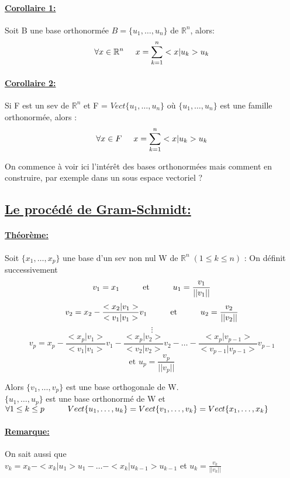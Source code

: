 \documentclass{article}
\newcommand\tab[1][1cm]{\hspace*{#1}}
\begin{document}
\paragraph{\underline{Corollaire 1:}} Soit B une base orthonormée $B = \{u_1, \dots, u_n\}$ de $\mathbb{R}^n$, alors:
$$\forall x \in \mathbb{R}^n \tab[0.5cm] x = \sum_{k=1}^n <x | u_k> u_k$$

\paragraph{\underline{Corollaire 2:}} Si F est un sev de $\mathbb{R}^n$ et F = $Vect\{u_1, \dots, u_n\}$ où $\{u_1, \dots, u_n\}$ est une famille orthonormée, alors :
$$\forall x \in F \tab[0.5cm] x = \sum_{k=1}^n <x | u_k> u_k$$

On commence à voir ici l'intérêt des bases orthonormées mais comment en construire, par exemple dans un sous espace vectoriel ?

\subsection{\underline{Le procédé de Gram-Schmidt:}}

\paragraph{\underline{Théorème:}} Soit $\{x_1, \dots, x_p\}$ une base d'un sev non nul W de $\mathbb{R}^n \; (1 \leq k \leq n)$ : On définit successivement
$$v_1 = x_1 \tab \mbox{et} \tab u_1 = \frac{v_1}{||v_1||}$$
$$v_2 = x_2 - \frac{<x_2|v_1>}{<v_1|v_1>}v_1 \tab \mbox{et} \tab u_2 = \frac{v_2}{||v_2||}$$
$$\vdots$$
$$v_p = x_p - \frac{<x_p|v_1>}{<v_1|v_1>}v_1 - \frac{<x_p|v_2>}{<v_2|v_2>}v_2 - \dots - \frac{<x_p|v_{p-1}>}{<v_{p-1}|v_{p-1}>}v_{p-1}$$
$$\mbox{et } u_p = \frac{v_p}{||v_p||}$$

Alors $\{v_1, \dots, v_p\}$ est une base orthogonale de W.\\
\tab[1.4cm] $\{u_1, \dots, u_p\}$ est une base orthonormé de W et\\
$\forall 1 \leq k \leq p \tab Vect\{u_1, \dots, u_k\} = Vect\{v_1, \dots, v_k\} = Vect\{x_1, \dots, x_k\}$

\paragraph{\underline{Remarque:}} On sait aussi que \\
$v_k = x_k - <x_k|u_1>u_1 - \dots - <x_k|u_{k-1}>u_{k-1}$ et $u_k = \frac{v_k}{||v_k||}$ 
\end{document}
